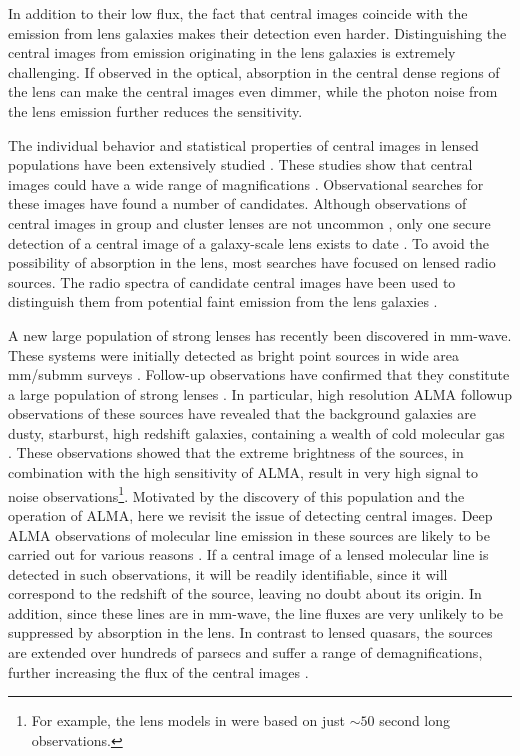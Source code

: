 \documentclass[chicago]{emulateapj}
\begin{document}
In addition to their low flux, the fact that central images coincide with the emission from lens galaxies makes their detection even harder. Distinguishing the central images from emission originating in the lens galaxies is extremely challenging.
If observed in the optical, absorption in the central dense regions of the lens can make the central images even dimmer, while the photon noise from the lens emission further reduces the sensitivity. 




The individual behavior and statistical properties of central images in lensed populations have been extensively studied \citep[e.g.,][]{Wallington:93, Evans:02, Keeton:03}. These studies show that central images could have a wide range of magnifications \citep[e.g.,][]{Keeton:03}. 
Observational searches for these images have found a number of candidates. Although observations
of central images in group and cluster lenses are not uncommon \citep[e.g.,][]{Inada:08}, only one secure detection of a central image of a galaxy-scale lens exists to date \citep{Winn:04}. To avoid the possibility of absorption in the lens, most searches have focused on lensed radio sources. The radio spectra of candidate central images have been used to distinguish them from potential faint emission from the lens galaxies \citep[e.g.,][]{Zhang:07}.

A new large population of strong lenses has recently been discovered in mm-wave. These systems were initially detected as bright point sources in wide area mm/submm surveys \citep{vieira:10,negrello:10}. Follow-up observations have confirmed that they constitute a large population of strong lenses \citep{vieira:13, hezaveh:13b, bussmann:13}.
In particular, high resolution ALMA followup observations of these sources have revealed that the background galaxies are dusty, starburst, high redshift galaxies, containing a wealth of cold molecular gas \citep{Weiss:13}.  These observations showed that the extreme brightness of the sources, in combination with the high sensitivity of ALMA, result in very high signal to noise observations\footnote{For example, the lens models in \citet{hezaveh:13b} were based on just $\sim50$ second long observations.}.
Motivated by the discovery of this population and the operation of ALMA, here we revisit the issue of detecting central images.
Deep ALMA observations of molecular line emission in these sources are likely to be carried out for various reasons \citep[e.g.,][]{hezaveh:14a,hezaveh:14b}. If a central image of a lensed molecular line is detected in such observations, it will be readily identifiable, since it will correspond to the redshift of the source, leaving no doubt about its origin. In addition, since these lines are in mm-wave, the line fluxes are very unlikely to be suppressed by absorption in the lens. 
In contrast to lensed quasars, the sources are extended over hundreds of parsecs and suffer a range of demagnifications, further increasing the flux of the central images \citep[analogous to magnification damping of highly magnified images due to finite source effects, see e.g.,][]{hezaveh:11}.
\end{document}
